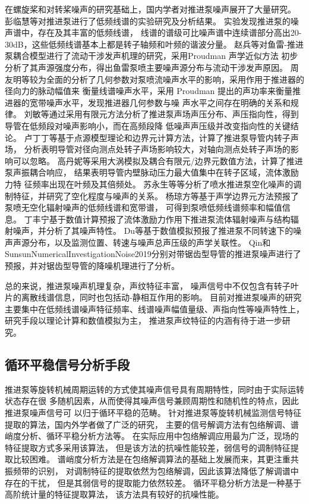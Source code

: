 在螺旋桨和对转桨噪声的研究基础上，国内学者对推进泵噪声展开了大量研究。
彭临慧等\cite{__1998彭临慧}对推进泵进行了低频线谱的实验研究及分析结果。
实验发现推进泵的噪声谱中，存在及其丰富的低频线谱，
线谱的谱级可比噪声谱中连续谱部分高出20-30dB，这些低频线谱基本上都是转子轴频和叶频的谐波分量。
赵兵等\cite{__2009赵兵}对鱼雷-推进泵耦合模型进行了流动干涉发声机理的研究，采用Proudman 声学近似方法
初步分析了其声源强度分布，得出鱼雷泵喷主要噪声源分布与流动干涉发声原因。
周友明等\cite{__2011周友明}较为全面的分析了几何参数对泵喷流噪声水平的影响，采用作用于推进器的径向力的脉动幅值来
衡量线谱噪声水平，采用 Proudman 提出的声功率来衡量推进器的宽带噪声水平，发现推进器几何参数与噪
声水平之间存在明确的关系和规律。
刘敏等\cite{__2011刘敏}通过采用有限元方法分析了推进泵声场声压分布、声压指向性，得到导管在低频段对噪声影响小，而在高频段降
低噪声声压级并改变指向性的关键结论。
卢丁丁等\cite{__2016卢丁丁}基于点源模型理论和边界元计算方法，计算了推进泵导管内转子声场，
分析表明导管对径向测点处转子声场影响较大，对轴向测点处转子声场的影响可以忽略。
高丹妮等\cite{__2018高丹妮}采用大涡模拟及耦合有限元/边界元数值方法，计算了推进泵声振耦合响应，
结果表明导管内壁脉动压力最大值集中在转子区域，流体激励力特
征频率出现在叶频及其倍频处。
苏永生等\cite{__2013苏永生}等分析了喷水推进泵空化噪声的调制特征，并研究了空化程度与噪声的关系。
杨琼方等\cite{__2016杨琼方}基于声学边界元方法预报了泵喷无空化辐射噪声的低频线谱和宽带谱，
可得到泵喷低频线谱频率和幅值信息。
丁丰宁\cite{__2019于丰宁}基于数值计算预报了流体激励力作用下推进泵流体辐射噪声与结构辐射噪声，并分析了其噪声特性。
Du等\cite{duNumericalAnalysisFlow2019a}基于数值模拟预报了推进泵不同转速下的噪声声源分布，以及监测位置、转速与噪声总声压级的声学关联性。
Qin\cite{qinUnderwaterRadiatedNoise2019a}和Sun{sunNumericalInvestigationNoise2019}分别对带锯齿型导管的推进泵噪声进行了预报，并对锯齿型导管的降噪机理进行了分析。

总的来说，推进泵噪声机理复杂，声纹特征丰富，
噪声信号中不仅包含有转子叶片的离散线谱信息，同时也包括动-静相互作用的影响。
目前对推进泵噪声的研究主要集中在低频线谱噪声特征频率、线谱噪声幅值量级、声指向性等噪声特性上，研究手段以理论计算和数值模拟为主，
推进泵声纹特征的内涵有待于进一步研究。

\subsection{循环平稳信号分析手段}
推进泵等旋转机械周期运转的方式使其噪声信号具有周期特性，同时由于实际运转状态存在很
多随机因素，从而使得其噪声信号兼顾周期性和随机性的特点，因此推进泵噪声信号可
以归于循环平稳的范畴\cite{陈进2013机械故障特征提取的循环平稳理论及方法}。
针对推进泵等旋转机械监测信号特征提取的算法，国内外学者做了广泛的研究，
主要的信号解调方法有包络解调、谱峭度分析、循环平稳分析方法等\cite{wangSpectralKurtosisFault2016}。
在实际应用中包络解调应用最为广泛，现场的特征提取方式多采用该算法，
但是该方法的抗噪性能较差，弱信号的调制特征提取比较困难\cite{abboudEnvelopeAnalysisRotating2017,2014The}。
谱峭度分析方法是在包络解调算法的基础上发展而来，其更注重共振频带的识别，
对调制特征的提取依然为包络解调，因此该算法降低了解调谱中存在的干扰，
但是其弱信号的提取能力依然较差\cite{2007Fast,2011A}。
循环平稳分析方法是一种基于高阶统计量的特征提取算法，
该方法具有较好的抗噪性能\cite{gardnerCyclostationarityHalfCentury2006,songRobustPassiveUnderwater2019}。

